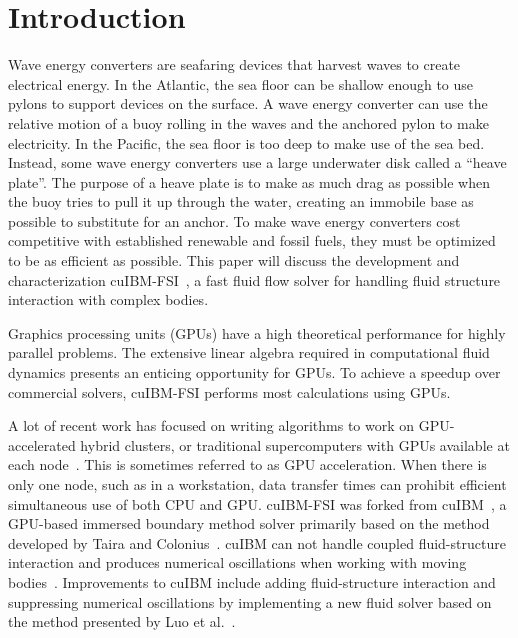 \maketitle

\mainmatter

\chapter{Introduction}
Wave energy converters are seafaring devices that harvest waves to create electrical energy. 
In the Atlantic, the sea floor can be shallow enough to use pylons to support devices on the surface. 
A wave energy converter can use the relative motion of a buoy rolling in the waves and the anchored pylon to make electricity. 
In the Pacific, the sea floor is too deep to make use of the sea bed. 
Instead, some wave energy converters use a large underwater disk called a ``heave plate''.
The purpose of a heave plate is to make as much drag as possible when the buoy tries to pull it up through the water, creating an immobile base as possible to substitute for an anchor. 
To make wave energy converters cost competitive with established renewable and fossil fuels, they must be optimized to be as efficient as possible. 
This paper will discuss the development and characterization cuIBM-FSI~\cite{cuIBM-v0.1}, a fast fluid flow solver for handling fluid structure interaction with complex bodies. 

Graphics processing units (GPUs) have a high theoretical performance for highly parallel problems. 
The extensive linear algebra required in computational fluid dynamics presents an enticing opportunity for GPUs. 
To achieve a speedup over commercial solvers, cuIBM-FSI performs most calculations using GPUs. 

A lot of recent work has focused on writing algorithms to work on GPU-accelerated hybrid clusters, or traditional supercomputers with GPUs available at each node~\cite{xu2014collaborating,liu2016hybrid,norouzi2016new}. 
This is sometimes referred to as GPU acceleration. 
When there is only one node, such as in a workstation, data transfer times can prohibit efficient simultaneous use of both CPU and GPU. 
cuIBM-FSI was forked from cuIBM~\cite{layton2011cuibm}, a GPU-based immersed boundary method solver primarily based on the method developed by Taira and Colonius~\cite{Taira:2007jl}. 
cuIBM can not handle coupled fluid-structure interaction and produces numerical oscillations when working with moving bodies~\cite{Krishnan:2012jt}. 
Improvements to cuIBM include adding fluid-structure interaction and suppressing numerical oscillations by implementing a new fluid solver based on the method presented by Luo et al.~\cite{Luo:2012gx}.

